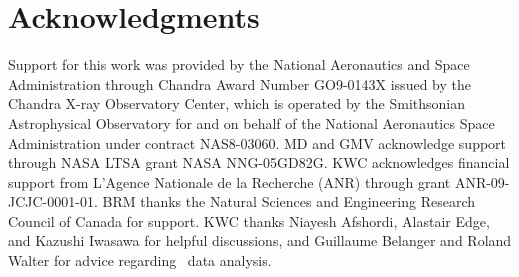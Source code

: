 \documentclass[useAMS,usenatbib]{mn2e}
\begin{document}
\section*{Acknowledgments}

Support for this work was provided by the National Aeronautics and
Space Administration through Chandra Award Number GO9-0143X issued by
the Chandra X-ray Observatory Center, which is operated by the
Smithsonian Astrophysical Observatory for and on behalf of the
National Aeronautics Space Administration under contract
NAS8-03060. MD and GMV acknowledge support through NASA LTSA grant
NASA NNG-05GD82G. KWC acknowledges financial support from L'Agence
Nationale de la Recherche (ANR) through grant ANR-09-JCJC-0001-01. BRM
thanks the Natural Sciences and Engineering Research Council of Canada
for support. KWC thanks Niayesh Afshordi, Alastair Edge, and Kazushi
Iwasawa for helpful discussions, and Guillaume Belanger and Roland
Walter for advice regarding \integral\ data analysis.






\clearpage
\onecolumn







\label{lastpage}
\end{document}
